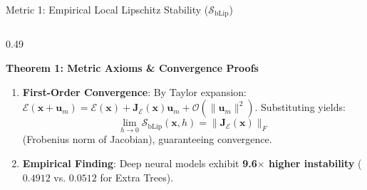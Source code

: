 \documentclass[aspectratio=169,10pt]{beamer}
\begin{document}
\begin{frame}{Metric 1: Empirical Local Lipschitz Stability ($\mathcal{S}_{\text{bLip}}$)}
\begin{columns}[t]
\begin{column}{0.49\textwidth}
\begin{exampleblock}{\textbf{Theorem 1: Metric Axioms \& Convergence Proofs}}
\begin{enumerate}
          \item \textbf{First-Order Convergence}: By Taylor expansion: $\mathcal{E}(\mathbf{x} + \mathbf{u}_m) = \mathcal{E}(\mathbf{x}) + \mathbf{J}_{\mathcal{E}}(\mathbf{x}) \mathbf{u}_m + \mathcal{O}(\|\mathbf{u}_m\|^2)$. Substituting yields:
          $$\lim_{h \to 0} \mathcal{S}_{\text{bLip}}(\mathbf{x}, h) = \|\mathbf{J}_{\mathcal{E}}(\mathbf{x})\|_F$$
          (Frobenius norm of Jacobian), guaranteeing convergence.
          \item \textbf{Empirical Finding}: Deep neural models exhibit \textbf{9.6$\times$ higher instability} ($0.4912$ vs. $0.0512$ for Extra Trees).
        \end{enumerate}
      \end{exampleblock}
    \end{column}
  \end{columns}
\end{frame}
\end{document}
